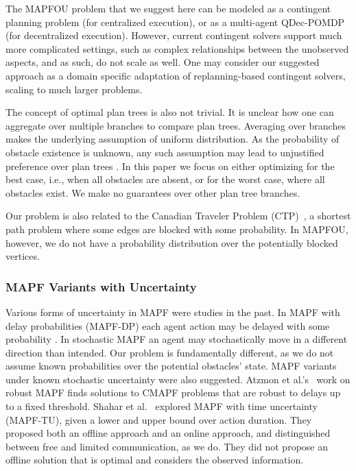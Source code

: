 \documentclass[letterpaper]{article} %
\begin{document}
The MAPFOU problem that we suggest here can be modeled as a contingent planning problem (for centralized execution), or as a multi-agent QDec-POMDP (for decentralized execution). However, current contingent solvers support much more complicated settings, such as complex relationships between the unobserved aspects, and as such, do not scale as well. One may consider our suggested approach as a domain specific adaptation of replanning-based contingent solvers, scaling to much larger problems.

The concept of optimal plan trees is also not trivial. It is unclear how one can aggregate over multiple branches to compare plan trees. Averaging over branches makes the underlying assumption of uniform distribution. As the probability of obstacle existence is unknown, any such assumption may lead to unjustified preference over plan trees \cite{shmaryahu2019comparative}. In this paper we focus on either optimizing for the best case, i.e., when all obstacles are absent, or for the worst case, where all obstacles exist. We make no guarantees over other plan tree branches.

Our problem is also related to the Canadian Traveler Problem (CTP)~\cite{papadimitriou1991shortest,bnaya2009canadian}, a shortest path problem where some edges are blocked with some probability. In MAPFOU, however, we do not have a probability distribution over the potentially blocked vertices.

\subsubsection{MAPF Variants with Uncertainty}
Various forms of uncertainty in MAPF were studies in the past.
In MAPF with delay probabilities (MAPF-DP) each agent action may be delayed with some probability \cite{wagner2017path,honig2016multi,atzmon2020probabilistic}. In stochastic MAPF
\cite{levy2022online} an agent may stochastically move in a different direction than intended.
Our problem is fundamentally different, as we do not assume known probabilities over the potential obstacles' state.
MAPF variants under known stochastic uncertainty were also suggested.
Atzmon et al.'s~ work on robust MAPF finds solutions to CMAPF problems that are robust to delays up to  a fixed threshold.
Shahar et al.~ explored MAPF with time uncertainty (MAPF-TU), given a lower and upper bound over action duration. They proposed both an offline approach and an online approach, and distinguished between free and limited communication, as we do.
They did not propose an offline solution that is optimal and considers the observed information.
\end{document}
